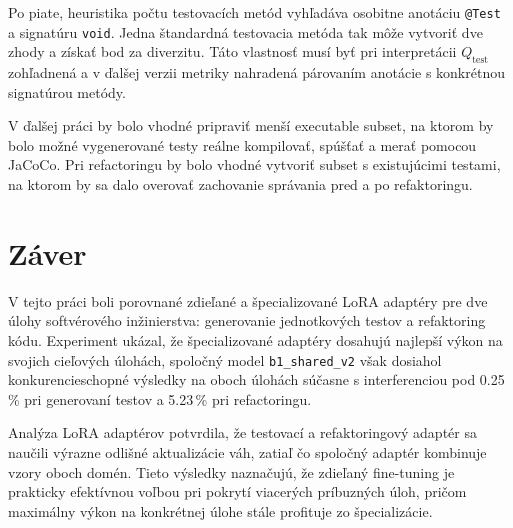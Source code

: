 \documentclass[11pt,a4paper]{article}
\newcommand{\modelshared}{\texttt{b1\_shared\_v2}}
\begin{document}
Po piate, heuristika počtu testovacích metód vyhľadáva osobitne anotáciu
\texttt{@Test} a signatúru \texttt{void}. Jedna štandardná testovacia metóda
tak môže vytvoriť dve zhody a získať bod za diverzitu. Táto vlastnosť musí byť
pri interpretácii $Q_{\mathrm{test}}$ zohľadnená a v ďalšej verzii metriky
nahradená párovaním anotácie s konkrétnou signatúrou metódy.

V ďalšej práci by bolo vhodné pripraviť menší executable subset, na ktorom by bolo možné vygenerované testy reálne kompilovať, spúšťať a merať pomocou JaCoCo. Pri refactoringu by bolo vhodné vytvoriť subset s existujúcimi testami, na ktorom by sa dalo overovať zachovanie správania pred a po refaktoringu.

\section{Záver}

V tejto práci boli porovnané zdieľané a špecializované LoRA adaptéry pre dve úlohy
softvérového inžinierstva: generovanie jednotkových testov a refaktoring kódu.
Experiment ukázal, že špecializované adaptéry dosahujú najlepší výkon na svojich
cieľových úlohách, spoločný model \modelshared{} však dosiahol konkurencieschopné
výsledky na oboch úlohách súčasne s interferenciou pod 0.25\,\% pri generovaní
testov a 5.23\,\% pri refactoringu.

Analýza LoRA adaptérov potvrdila, že testovací a refaktoringový adaptér sa naučili
výrazne odlišné aktualizácie váh, zatiaľ čo spoločný adaptér kombinuje vzory oboch
domén. Tieto výsledky naznačujú, že zdieľaný fine-tuning je prakticky efektívnou
voľbou pri pokrytí viacerých príbuzných úloh, pričom maximálny výkon na konkrétnej
úlohe stále profituje zo špecializácie.




\end{document}
